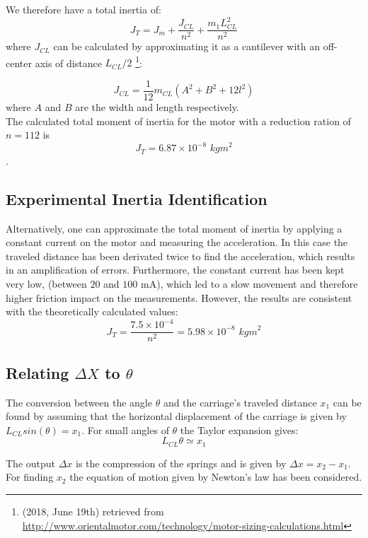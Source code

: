 We therefore have a total inertia of:
\begin{equation}
	J_T = J_m + \frac{J_{CL}}{n^2} + \frac{ m_1 L_{CL}^2}{n^2}
\end{equation}
where $J_{CL}$ can be calculated by approximating it as a cantilever with an off-center axis of distance $L_{CL} /2$ \footnote{(2018, June 19th) retrieved from \url{http://www.orientalmotor.com/technology/motor-sizing-calculations.html}}: 
	
\begin{equation}
	J_{CL} = \frac{1}{12}m_{CL}(A^2 + B^2 + 12l^2)
\end{equation}
where $A$ and $B$ are the width and length respectively.\\
The calculated total moment of inertia for the motor with a reduction ration of $n = 112$ is 
$$J_T = 6.87 \times 10^{-8} \textit{ kgm}^2$$.
	
\subsection{Experimental Inertia Identification}
Alternatively, one can approximate the total moment of inertia by applying a constant current on the motor and measuring the acceleration. In this case the traveled distance has been derivated twice to find the acceleration, which results in an amplification of errors. Furthermore, the constant current has been kept very low, (between $20$ and $100$ mA), which led to a slow movement and therefore higher friction impact on the measurements. However, the results are consistent with the theoretically calculated values:
$$ J_T = \frac{7.5 \times 10^{-4}}{n^2} = 5.98 \times 10^{-8} \textit{ kgm}^2$$ 
	
\subsection{Relating $\Delta X$ to $\theta$}
The conversion between the angle $\theta$ and the carriage's traveled distance $x_1$ can be found by assuming that the horizontal displacement of the carriage is given by $L_{CL} sin(\theta) = x_1$. For small angles of $\theta$ the Taylor expansion gives:
\begin{equation}
	L_{CL} \theta \simeq x_1
	\label{eq:assum}
\end{equation} 
	
The output $\Delta x$ is the compression of the springs and is given by $\Delta x = x_2 - x_1$. For finding $x_2$ the equation of motion given by Newton's law has been considered.
	
